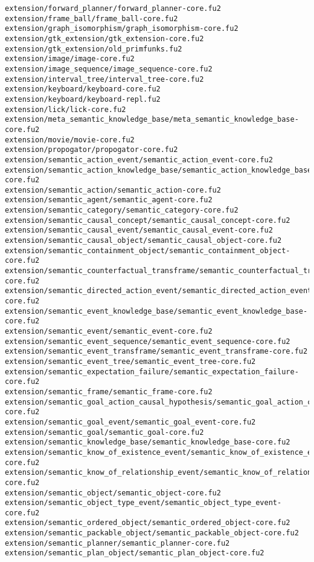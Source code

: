 \begin{lstlisting}
extension/forward_planner/forward_planner-core.fu2
extension/frame_ball/frame_ball-core.fu2
extension/graph_isomorphism/graph_isomorphism-core.fu2
extension/gtk_extension/gtk_extension-core.fu2
extension/gtk_extension/old_primfunks.fu2
extension/image/image-core.fu2
extension/image_sequence/image_sequence-core.fu2
extension/interval_tree/interval_tree-core.fu2
extension/keyboard/keyboard-core.fu2
extension/keyboard/keyboard-repl.fu2
extension/lick/lick-core.fu2
extension/meta_semantic_knowledge_base/meta_semantic_knowledge_base-core.fu2
extension/movie/movie-core.fu2
extension/propogator/propogator-core.fu2
extension/semantic_action_event/semantic_action_event-core.fu2
extension/semantic_action_knowledge_base/semantic_action_knowledge_base-core.fu2
extension/semantic_action/semantic_action-core.fu2
extension/semantic_agent/semantic_agent-core.fu2
extension/semantic_category/semantic_category-core.fu2
extension/semantic_causal_concept/semantic_causal_concept-core.fu2
extension/semantic_causal_event/semantic_causal_event-core.fu2
extension/semantic_causal_object/semantic_causal_object-core.fu2
extension/semantic_containment_object/semantic_containment_object-core.fu2
extension/semantic_counterfactual_transframe/semantic_counterfactual_transframe-core.fu2
extension/semantic_directed_action_event/semantic_directed_action_event-core.fu2
extension/semantic_event_knowledge_base/semantic_event_knowledge_base-core.fu2
extension/semantic_event/semantic_event-core.fu2
extension/semantic_event_sequence/semantic_event_sequence-core.fu2
extension/semantic_event_transframe/semantic_event_transframe-core.fu2
extension/semantic_event_tree/semantic_event_tree-core.fu2
extension/semantic_expectation_failure/semantic_expectation_failure-core.fu2
extension/semantic_frame/semantic_frame-core.fu2
extension/semantic_goal_action_causal_hypothesis/semantic_goal_action_causal_hypothesis-core.fu2
extension/semantic_goal_event/semantic_goal_event-core.fu2
extension/semantic_goal/semantic_goal-core.fu2
extension/semantic_knowledge_base/semantic_knowledge_base-core.fu2
extension/semantic_know_of_existence_event/semantic_know_of_existence_event-core.fu2
extension/semantic_know_of_relationship_event/semantic_know_of_relationship_event-core.fu2
extension/semantic_object/semantic_object-core.fu2
extension/semantic_object_type_event/semantic_object_type_event-core.fu2
extension/semantic_ordered_object/semantic_ordered_object-core.fu2
extension/semantic_packable_object/semantic_packable_object-core.fu2
extension/semantic_planner/semantic_planner-core.fu2
extension/semantic_plan_object/semantic_plan_object-core.fu2

\end{lstlisting}
